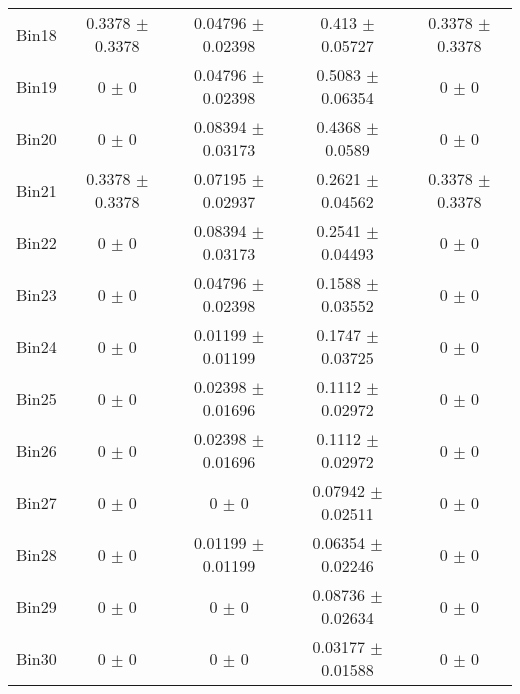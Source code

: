 \begin{tabular}{@{\extracolsep{4pt}}lcccc@{}}
     Bin18 & 0.3378 $\pm$ 0.3378 & 0.04796 $\pm$ 0.02398 & 0.413 $\pm$ 0.05727 & 0.3378 $\pm$ 0.3378 \\ 
     Bin19 & 0 $\pm$ 0 & 0.04796 $\pm$ 0.02398 & 0.5083 $\pm$ 0.06354 & 0 $\pm$ 0 \\ 
     Bin20 & 0 $\pm$ 0 & 0.08394 $\pm$ 0.03173 & 0.4368 $\pm$ 0.0589 & 0 $\pm$ 0 \\ 
     Bin21 & 0.3378 $\pm$ 0.3378 & 0.07195 $\pm$ 0.02937 & 0.2621 $\pm$ 0.04562 & 0.3378 $\pm$ 0.3378 \\ 
     Bin22 & 0 $\pm$ 0 & 0.08394 $\pm$ 0.03173 & 0.2541 $\pm$ 0.04493 & 0 $\pm$ 0 \\ 
     Bin23 & 0 $\pm$ 0 & 0.04796 $\pm$ 0.02398 & 0.1588 $\pm$ 0.03552 & 0 $\pm$ 0 \\ 
     Bin24 & 0 $\pm$ 0 & 0.01199 $\pm$ 0.01199 & 0.1747 $\pm$ 0.03725 & 0 $\pm$ 0 \\ 
     Bin25 & 0 $\pm$ 0 & 0.02398 $\pm$ 0.01696 & 0.1112 $\pm$ 0.02972 & 0 $\pm$ 0 \\ 
     Bin26 & 0 $\pm$ 0 & 0.02398 $\pm$ 0.01696 & 0.1112 $\pm$ 0.02972 & 0 $\pm$ 0 \\ 
     Bin27 & 0 $\pm$ 0 & 0 $\pm$ 0 & 0.07942 $\pm$ 0.02511 & 0 $\pm$ 0 \\ 
     Bin28 & 0 $\pm$ 0 & 0.01199 $\pm$ 0.01199 & 0.06354 $\pm$ 0.02246 & 0 $\pm$ 0 \\ 
     Bin29 & 0 $\pm$ 0 & 0 $\pm$ 0 & 0.08736 $\pm$ 0.02634 & 0 $\pm$ 0 \\ 
     Bin30 & 0 $\pm$ 0 & 0 $\pm$ 0 & 0.03177 $\pm$ 0.01588 & 0 $\pm$ 0 \\ 
\hline\hline
  \end{tabular}
